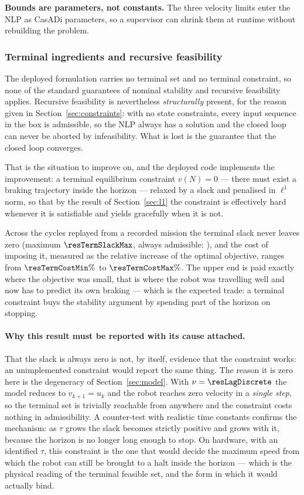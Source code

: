 \documentclass[11pt,a4paper]{article}
\begin{document}
\textbf{Bounds are parameters, not constants.} The three velocity limits enter the NLP as CasADi parameters,
so a supervisor can shrink them at runtime without rebuilding the problem.

\subsubsection{Terminal ingredients and recursive feasibility}
\label{sec:terminal}

The deployed formulation carries no terminal set and no terminal constraint, so none of the standard
guarantees of nominal stability and recursive feasibility \cite{mayne2000constrained} applies. Recursive
feasibility is nevertheless \emph{structurally} present, for the reason given in
Section~\ref{sec:constraints}: with no state constraints, every input sequence in the box is admissible, so
the NLP always has a solution and the closed loop can never be aborted by infeasibility. What is lost is the
guarantee that the closed loop converges.

That is the situation to improve on, and the deployed code implements the improvement: a terminal equilibrium
constraint $v(N)=0$ --- there must exist a braking trajectory inside the horizon --- relaxed by a slack and
penalised in $\ell^1$ norm, so that by the result of Section~\ref{sec:l1} the constraint is effectively hard
whenever it is satisfiable and yields gracefully when it is not.

Across the cycles replayed from a recorded mission the terminal slack never leaves zero (maximum
$\resTermSlackMax$, always admissible: \resTermFeasible), and the cost of imposing it, measured as the
relative increase of the optimal objective, ranges from $\resTermCostMin\%$ to $\resTermCostMax\%$. The upper
end is paid exactly where the objective was small, that is where the robot was travelling well and now has to
predict its own braking --- which is the expected trade: a terminal constraint buys the stability argument by
spending part of the horizon on stopping.

\paragraph{Why this result must be reported with its cause attached.} That the slack is always zero is not,
by itself, evidence that the constraint works: an unimplemented constraint would report the same thing. The
reason it is zero here is the degeneracy of Section~\ref{sec:model}. With $\nu=\resLagDiscrete$ the model
reduces to $v_{k+1}=u_k$ and the robot reaches zero velocity in a \emph{single step}, so the terminal set is
trivially reachable from anywhere and the constraint costs nothing in admissibility. A counter-test with
realistic time constants confirms the mechanism: as $\tau$ grows the slack becomes strictly positive and
grows with it, because the horizon is no longer long enough to stop. On hardware, with an identified $\tau$,
this constraint is the one that would decide the maximum speed from which the robot can still be brought to a
halt inside the horizon --- which is the physical reading of the terminal feasible set, and the form in which
it would actually bind.
\end{document}
